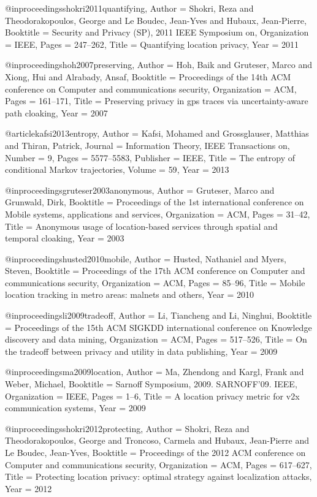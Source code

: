 {{{{{{{{{@inproceedings{shokri2011quantifying,
	Author = {Shokri, Reza and Theodorakopoulos, George and Le Boudec, Jean-Yves and Hubaux, Jean-Pierre},
	Booktitle = {Security and Privacy (SP), 2011 IEEE Symposium on},
	Organization = {IEEE},
	Pages = {247--262},
	Title = {Quantifying location privacy},
	Year = {2011}}

@inproceedings{hoh2007preserving,
	Author = {Hoh, Baik and Gruteser, Marco and Xiong, Hui and Alrabady, Ansaf},
	Booktitle = {Proceedings of the 14th ACM conference on Computer and communications security},
	Organization = {ACM},
	Pages = {161--171},
	Title = {Preserving privacy in gps traces via uncertainty-aware path cloaking},
	Year = {2007}}



@article{kafsi2013entropy,
	Author = {Kafsi, Mohamed and Grossglauser, Matthias and Thiran, Patrick},
	Journal = {Information Theory, IEEE Transactions on},
	Number = {9},
	Pages = {5577--5583},
	Publisher = {IEEE},
	Title = {The entropy of conditional Markov trajectories},
	Volume = {59},
	Year = {2013}}

@inproceedings{gruteser2003anonymous,
	Author = {Gruteser, Marco and Grunwald, Dirk},
	Booktitle = {Proceedings of the 1st international conference on Mobile systems, applications and services},
	Organization = {ACM},
	Pages = {31--42},
	Title = {Anonymous usage of location-based services through spatial and temporal cloaking},
	Year = {2003}}

@inproceedings{husted2010mobile,
	Author = {Husted, Nathaniel and Myers, Steven},
	Booktitle = {Proceedings of the 17th ACM conference on Computer and communications security},
	Organization = {ACM},
	Pages = {85--96},
	Title = {Mobile location tracking in metro areas: malnets and others},
	Year = {2010}}

@inproceedings{li2009tradeoff,
	Author = {Li, Tiancheng and Li, Ninghui},
	Booktitle = {Proceedings of the 15th ACM SIGKDD international conference on Knowledge discovery and data mining},
	Organization = {ACM},
	Pages = {517--526},
	Title = {On the tradeoff between privacy and utility in data publishing},
	Year = {2009}}

@inproceedings{ma2009location,
	Author = {Ma, Zhendong and Kargl, Frank and Weber, Michael},
	Booktitle = {Sarnoff Symposium, 2009. SARNOFF'09. IEEE},
	Organization = {IEEE},
	Pages = {1--6},
	Title = {A location privacy metric for v2x communication systems},
	Year = {2009}}

@inproceedings{shokri2012protecting,
	Author = {Shokri, Reza and Theodorakopoulos, George and Troncoso, Carmela and Hubaux, Jean-Pierre and Le Boudec, Jean-Yves},
	Booktitle = {Proceedings of the 2012 ACM conference on Computer and communications security},
	Organization = {ACM},
	Pages = {617--627},
	Title = {Protecting location privacy: optimal strategy against localization attacks},
	Year = {2012}}

}}}}}}}}}
